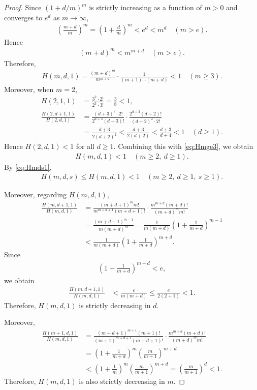 \documentclass[12pt,reqno]{amsart}
\newcommand{\q}{\quad}									%
\newcommand{\f}[2]{\frac{#1}{#2}}							%
\theoremstyle{mythmstyle}
\theoremstyle{mydefstyle}
\numberwithin{equation}{section}
\begin{document}
\begin{proof}
Since $(1+d/m)^{m}$ is strictly increasing as a function of $m > 0$
and converges to $e^{d}$ as $m \to \infty$,
\begin{align}
\left(\f{m+d}{m}\right)^{m} = \left(1+\f{d}{m}\right)^{m} < e^{d} < m^{d} \q (m>e).
\end{align}
Hence
\begin{align}
(m+d)^{m} < m^{m+d} \q (m > e).
\end{align}
Therefore,
\begin{align}
\label{eq:Hmge3}
H(m, d, 1) = \f{(m+d)^{m}}{m^{m+d}}\cdot\f{1}{(m+1)\cdots(m+d)} < 1\q (m \ge 3).
\end{align}
Moreover, when $m = 2$,
\begin{align}
H(2, 1, 1) &= \f{3^{2}\cdot 2!}{2^{3}\cdot 3!} = \f{3}{8} < 1, \\
\f{H(2, d+1, 1)}{H(2, d, 1)} &= \f{(d+3)^{2}\cdot 2!}{2^{d+3}(d+3)!}\cdot\f{2^{d+2}(d+2)!}{(d+2)^{2}\cdot 2!} \\
&= \f{d+3}{2(d+2)^{2}} < \f{d+3}{2(d+2)} < \f{d+3}{d+4} < 1\q(d \ge 1).
\end{align}
Hence $H(2,d,1)<1$ for all $d \ge 1$.
Combining this with \eqref{eq:Hmge3}, we obtain
\begin{align}
H(m, d, 1) < 1 \q (m \ge 2,\ d \ge 1).
\end{align}
By \eqref{eq:Hmds1},
\begin{align}
\label{eq:Hmds2}
H(m, d, s) \le H(m, d, 1) < 1 \q (m \ge 2,\ d \ge 1,\ s \ge 1).
\end{align}

Moreover, regarding $H(m, d, 1)$,
\begin{align}
\f{H(m, d+1, 1)}{H(m, d, 1)} &= \f{(m+d+1)^{m}m!}{m^{m+d+1}(m+d+1)!}\cdot\f{m^{m+d}(m+d)!}{(m+d)^{m}m!} \\
&= \f{(m+d+1)^{m-1}}{m(m+d)^{m}} = \f{1}{m(m+d)}\left(1+\f{1}{m+d}\right)^{m-1} \\
&< \f{1}{m(m+d)}\left(1+\f{1}{m+d}\right)^{m+d}.
\end{align}
Since
\begin{align}
\left(1+\f{1}{m+d}\right)^{m+d} < e,
\end{align}
we obtain
\begin{align}
\f{H(m, d+1, 1)}{H(m, d, 1)} &< \f{e}{m(m+d)} \le \f{e}{2(2+1)} < 1.
\end{align}
Therefore, $H(m,d,1)$ is strictly decreasing in $d$.

Moreover,
\begin{align}
\f{H(m+1, d, 1)}{H(m, d, 1)} &= \f{(m+d+1)^{m+1}(m+1)!}{(m+1)^{m+d+1}(m+d+1)!} \cdot\f{m^{m+d}(m+d)!}{(m+d)^{m}m!} \\
&= \left(1 + \f{1}{m+d}\right)^{m}\left(\f{m}{m+1}\right)^{m+d} \\
&< \left(1 + \f{1}{m}\right)^{m}\left(\f{m}{m+1}\right)^{m+d} = \left(\f{m}{m+1}\right)^{d} < 1.
\end{align}
Therefore, $H(m, d, 1)$ is also strictly decreasing in $m$.


\end{proof}
\end{document}

